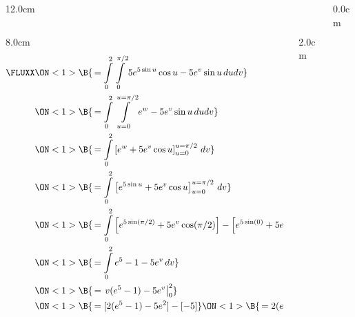 \begin{frame}
\begin{columns}\begin{column}{12.0cm}
\scriptsize
\begin{columns}
\begin{column}{8.0cm}
\begin{align*}
	\FLUXX 
	&\ON<1>{\B{\, = \int \limits_{0}^{2}\int \limits_{0}^{\pi/2} 5e^{5\sin u}\cos u - 5e^v\sin u \, dudv}} \\
	&\ON<1>{\B{\, = \int \limits_{0}^{2}\int \limits_{u=0}^{u=\pi/2} e^w - 5e^v\sin u\, dudv}} \\
	&\ON<1>{\B{\, = \int \limits_{0}^{2}\left[e^w + 5e^v\cos u \right]_{u=0}^{u=\pi/2} \, dv}} \\
	&\ON<1>{\B{\, = \int \limits_{0}^{2}\left[e^{5\sin u} + 5e^v\cos u \right]_{u=0}^{u=\pi/2} \, dv}} \\
	&\ON<1>{\B{\, = \int \limits_{0}^{2}\left[e^{5\sin (\pi/2)} + 5e^v\cos (\pi/2) \right]-\left[e^{5\sin (0)} + 5e^v\cos (0) \right] \, dv}} \\
	&\ON<1>{\B{\, = \int \limits_{0}^{2}e^{5}-1 - 5e^v \, dv}}\\
	&\ON<1>{\B{\, = \left.v(e^{5}-1) - 5e^v \right|_0^2}} \\
	&\ON<1>{\B{\, = [2(e^{5}-1) - 5e^2] - [-5]}}
	\ON<1>{\B{\, = 2(e^{5}-1) - 5e^2 + 5}}
\end{align*}
\end{column}
\begin{column}{2.0cm}
	\ON<1>{\B{$\D{w=5\sin u}$}}
	
	\vspace{0.2cm}
	
	
	\vspace{6.2cm}
	
\end{column}
\end{columns}

\vspace{4.2cm}

\end{column}\begin{column}{0.0cm}\end{column}\end{columns}
\end{frame}

